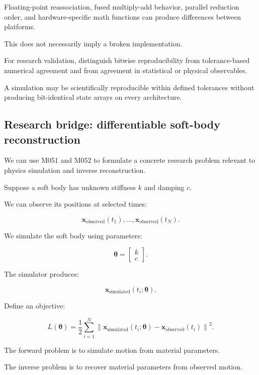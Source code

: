 Floating-point reassociation, fused multiply-add behavior, parallel reduction order, and hardware-specific math functions can produce differences between platforms.

This does not necessarily imply a broken implementation.

For research validation, distinguish bitwise reproducibility from tolerance-based numerical agreement and from agreement in statistical or physical observables.

A simulation may be scientifically reproducible within defined tolerances without producing bit-identical state arrays on every architecture.

\subsection{Research bridge: differentiable soft-body reconstruction}\label{02-foundations-ii-ch022-research-bridge-differentiable-soft-body-reconstruction}

\hypertarget{02-foundations-ii-ch022-research-bridge-differentiable-soft-body-reconstruction}{}

We can use M051 and M052 to formulate a concrete research problem relevant to physics simulation and inverse reconstruction.

Suppose a soft body has unknown stiffness \(k\) and damping \(c\).

We can observe its positions at selected times:

\[
\mathbf x_{\mathrm{observed}}(t_1),\ldots, \mathbf x_{\mathrm{observed}}(t_N).
\]

We simulate the soft body using parameters:

\[
\boldsymbol\theta= \begin{bmatrix} k\\c \end{bmatrix}.
\]

The simulator produces:

\[
\mathbf x_{\mathrm{simulated}}(t_i;\boldsymbol\theta).
\]

Define an objective:

\[
\boxed{ L(\boldsymbol\theta)= \frac12\sum_{i=1}^{N} \left\| \mathbf x_{\mathrm{simulated}}(t_i;\boldsymbol\theta) - \mathbf x_{\mathrm{observed}}(t_i) \right\|^2 }.
\]

The forward problem is to simulate motion from material parameters.

The inverse problem is to recover material parameters from observed motion.

